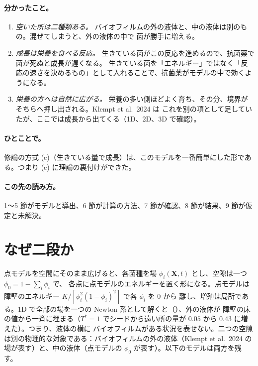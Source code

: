 \documentclass[11pt,a4paper]{article}
\theoremstyle{definition}
\begin{document}
\paragraph{分かったこと。}
\begin{enumerate}
\item \emph{空いた所は二種類ある。} バイオフィルムの外の液体と、中の液体は別のもの。混ぜてしまうと、外の液体の中で
  菌が勝手に増える。
\item \emph{成長は栄養を食べる反応。} 生きている菌がこの反応を進めるので、抗菌薬で菌が死ぬと成長が遅くなる。
  生きている菌を「エネルギー」ではなく「反応の速さを決めるもの」として入れることで、抗菌薬がモデルの中で効くようになる。
\item \emph{栄養の方へは自然に広がる。} 栄養の多い側ほどよく育ち、その分、境界がそちらへ押し出される。Klempt et al.\ 2024 は
  これを別の項として足していたが、ここでは成長から出てくる（1D、2D、3D で確認）。
\end{enumerate}

\paragraph{ひとことで。} 修論の方式 (c)（生きている量で成長）は、このモデルを一番簡単にした形である。つまり (c) に理論の裏付けができた。

\paragraph{この先の読み方。} 1〜5 節がモデルと導出、6 節が計算の方法、7 節が確認、8 節が結果、9 節が仮定と未解決。

\section{なぜ二段か}
\label{sec:two}

点モデルを空間にそのまま広げると、各菌種を場 $\phi_i(\mathbf X,t)$ とし、空隙は一つ $\phi_0=1-\sum_i\phi_i$ で、
各点に点モデルのエネルギーを置く形になる。点モデルは障壁のエネルギー $K/[\phi_i^2(1-\phi_i)^2]$ で各 $\phi_i$ を 0 から
離し、増殖は局所である。1D で全部の場を一つの Newton 系として解くと（）、外の液体が
障壁の床の値から一斉に埋まる（$T^*=1$ でシードから遠い所の量が $0.05$ から $0.43$ に増えた）。つまり、液体の横に
バイオフィルムがある状況を表せない。二つの空隙は別の物理的な対象である：バイオフィルムの外の液体（Klempt et al.\ 2024 の
場が表す）と、中の液体（点モデルの $\phi_0$ が表す）。以下のモデルは両方を残す。
\end{document}
